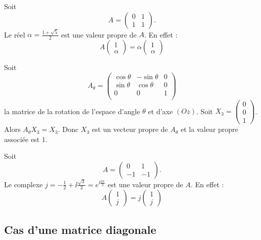 \documentclass[11pt, class=report,crop=false]{standalone}
\begin{document}
\begin{exemple}
Soit
$$A = \begin{pmatrix}0 & 1\\1 &1\end{pmatrix}.$$
Le réel $\alpha =\frac{1+\sqrt{5}}{2}$ est une valeur propre de $A$. En effet :
\[A\begin{pmatrix}1\\\alpha\end{pmatrix}
= \alpha \begin{pmatrix}1\\\alpha\end{pmatrix}\]
\end{exemple}



\begin{exemple}
Soit 
$$A_\theta = \begin{pmatrix}
\cos\theta & -\sin\theta & 0 \\
\sin\theta &  \cos\theta & 0 \\
0          & 0           & 1 \\
\end{pmatrix}$$
la matrice de la rotation de l'espace d'angle $\theta$ et d'axe $(Oz)$.
Soit $X_3 = \left( \begin{smallmatrix} 0 \\ 0 \\ 1 \end{smallmatrix}\right)$.  
Alors $A_\theta X_3=X_3$. Donc $X_3$ est un vecteur propre de $A_\theta$ et la valeur propre associée est $1$.
\end{exemple}


\begin{exemple}
Soit
$$A = \begin{pmatrix}0 & 1\\-1 &-1\end{pmatrix}.$$
Le complexe $j =-\frac{1}{2} + \ii \frac{\sqrt{3}}{2} = e^{\ii\frac{2\pi}{3}}$ est une valeur propre de $A$. En effet :
\[A\begin{pmatrix}1\\j\end{pmatrix} 
= j\begin{pmatrix}1\\j\end{pmatrix}\]
\end{exemple}


\subsection{Cas d'une matrice diagonale}
\end{document}
